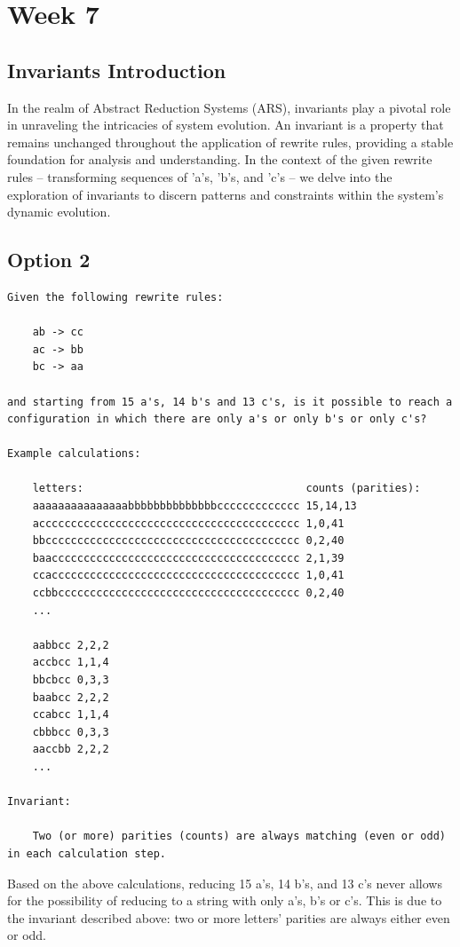 \documentclass{article}
\theoremstyle{theorem}
\theoremstyle{definition}
\theoremstyle{remark}
\begin{document}
\section{Week 7}

\subsection{Invariants Introduction}

In the realm of Abstract Reduction Systems (ARS), invariants play a pivotal role in unraveling the intricacies of system evolution. An invariant is a property that remains unchanged throughout the application of rewrite rules, providing a stable foundation for analysis and understanding. In the context of the given rewrite rules – transforming sequences of 'a's, 'b's, and 'c's – we delve into the exploration of invariants to discern patterns and constraints within the system's dynamic evolution.

\subsection{Option 2}

\begin{lstlisting}
Given the following rewrite rules:

    ab -> cc
    ac -> bb
    bc -> aa

and starting from 15 a's, 14 b's and 13 c's, is it possible to reach a configuration in which there are only a's or only b's or only c's?

Example calculations: 

    letters:                                   counts (parities):
    aaaaaaaaaaaaaaabbbbbbbbbbbbbbccccccccccccc 15,14,13
    accccccccccccccccccccccccccccccccccccccccc 1,0,41
    bbcccccccccccccccccccccccccccccccccccccccc 0,2,40
    baaccccccccccccccccccccccccccccccccccccccc 2,1,39
    ccaccccccccccccccccccccccccccccccccccccccc 1,0,41
    ccbbcccccccccccccccccccccccccccccccccccccc 0,2,40
    ...

    aabbcc 2,2,2
    accbcc 1,1,4
    bbcbcc 0,3,3
    baabcc 2,2,2
    ccabcc 1,1,4
    cbbbcc 0,3,3
    aaccbb 2,2,2
    ...

Invariant: 

    Two (or more) parities (counts) are always matching (even or odd) in each calculation step.
\end{lstlisting}

Based on the above calculations, reducing 15 a's, 14 b's, and 13 c's never allows for the possibility of reducing to a string with only a's, b's or c's. This is due to the invariant described above: two or more letters' parities are always either even or odd.
\end{document}
